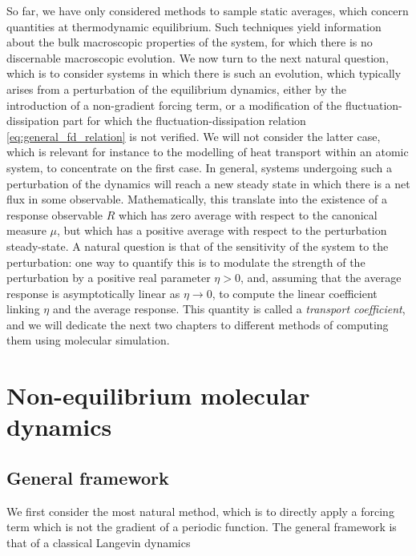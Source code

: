 So far, we have only considered methods to sample static averages, which concern quantities at thermodynamic equilibrium.
Such techniques yield information about the bulk macroscopic properties of the system, for which there is no discernable macroscopic evolution.
We now turn to the next natural question, which is to consider systems in which there is such an evolution,
 which typically arises from a perturbation of the equilibrium dynamics, either by the introduction of a non-gradient forcing term, 
 or a modification of the fluctuation-dissipation part for which the fluctuation-dissipation relation \eqref{eq:general_fd_relation} is not verified.
 We will not consider the latter case, which is relevant for instance to the modelling of heat transport within an atomic system, to concentrate on the first case.
 In general, systems undergoing such a perturbation of the dynamics will reach a new steady state in which there is a net flux in some observable.
 Mathematically, this translate into the existence of a response observable $R$ which has zero average with respect to the canonical measure $\mu$, but which has a positive average with respect to the perturbation steady-state.
 A natural question is that of the sensitivity of the system to the perturbation: one way to quantify this is to modulate the strength of the perturbation by a positive real parameter $\eta>0$, and,
  assuming that the average response is asymptotically linear as $\eta\to 0$, to compute the linear coefficient linking $\eta$ and the average response. 
  This quantity is called a \textit{transport coefficient}, and we will dedicate the next two chapters to different methods of computing them using molecular simulation.

\section{Non-equilibrium molecular dynamics}
\subsection{General framework}
We first consider the most natural method, which is to directly apply a forcing term which is not the gradient of a periodic function. 
The general framework is that of a classical Langevin dynamics

